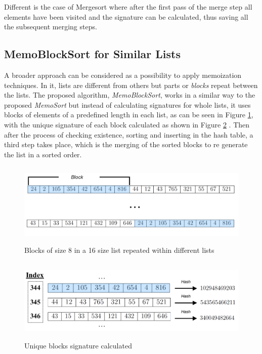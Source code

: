\documentclass[a4paper,12pt]{article}
\begin{document}
Different is the case of Mergesort where after the first pass of the merge step all elements have been visited and the signature can be calculated, thus saving all the subsequent merging steps.

\subsection{MemoBlockSort for Similar Lists} \label{MemoBlockSort}
A broader approach can be considered as a possibility to apply memoization techniques. In it, lists are different from others but parts or {\it blocks} repeat between the lists. The proposed algorithm, {\it MemoBlockSort}, works in a similar way to the proposed  {\it MemoSort} but instead of calculating signatures for whole lists, it uses blocks of elements of a predefined length in each list, as can be seen in Figure \ref{fig:MemoBlocSortDiagram}, with the unique signature of each block calculated as shown in Figure \ref{fig:MemoBlocSortDiagramHash} . Then after the process of checking existence, sorting and inserting in the hash table, a third step takes place, which is the merging of the sorted blocks to re generate the list in a sorted order.\\

\begin{figure}[H]
    \centering
     \includegraphics[height=4cm,keepaspectratio]{./images/MemoBlockSort.png}
    \caption{Blocks of size 8 in a 16 size list repeated within different lists}
    \label{fig:MemoBlocSortDiagram}
\end{figure}

\begin{figure}[H]
    \centering
     \includegraphics[height=4cm,keepaspectratio]{./images/MemoBlockSortHash.png}
    \caption{Unique blocks signature calculated}
    \label{fig:MemoBlocSortDiagramHash}
\end{figure}
\end{document}
